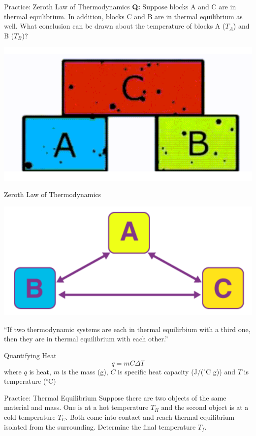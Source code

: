 \documentclass[11pt]{beamer}
\begin{document}
\begin{frame}{Practice: Zeroth Law of Thermodynamics}
  \textbf{Q:} Suppose blocks A and C are in thermal equilibrium.
  In addition, blocks C and B are in thermal equilibrium as well.
  What conclusion can be drawn about the temperature of blocks A ($T_A$)
  and B ($T_B$)?
  
  \centering
  \includegraphics[width=0.7\linewidth]{zeroth_law}
\end{frame}

\begin{frame}{Zeroth Law of Thermodynamics}
  \begin{center}
    \includegraphics[width=0.7\linewidth]{trans_thermal}
  \end{center}

  ``If two thermodynamic systems are each in thermal equilirbium with a third one,
  then they are in thermal equilibrium with each other.''
\end{frame}

\begin{frame}{Quantifying Heat}
  \begin{equation}
    q = mC\Delta T
  \end{equation}
  where $q$ is heat, $m$ is the mass (g), $C$ is
  specific heat capacity (J/($^\circ$C g)) and $T$ is
  temperature ($^\circ$C)
\end{frame}

\begin{frame}{Practice: Thermal Equilibrium}
  Suppose there are two objects of the same material and mass.
  One is at a hot temperature $T_H$ and the second object is at a cold temperature
  $T_C$. Both come into contact and reach thermal equilibrium isolated from the
  surrounding. Determine the final temperature $T_f$.
  \vspace{1.2in}
\end{frame}
\end{document}

